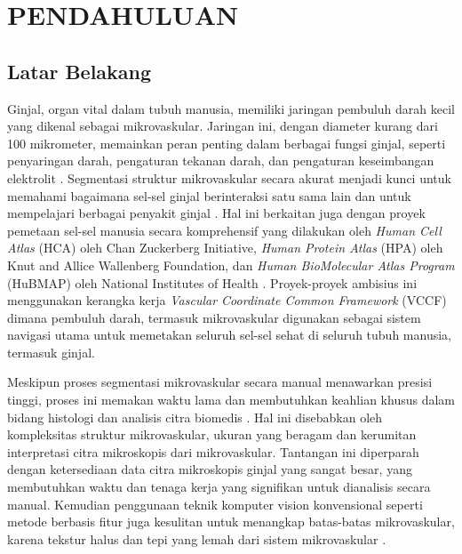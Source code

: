 \chapter{PENDAHULUAN}
\section{Latar Belakang}
\label{section:latarbelakang}
\noindent Ginjal, organ vital dalam tubuh manusia, memiliki jaringan pembuluh darah kecil yang dikenal sebagai mikrovaskular. Jaringan ini, dengan diameter kurang dari 100 mikrometer, memainkan peran penting dalam berbagai fungsi ginjal, seperti penyaringan darah, pengaturan tekanan darah, dan pengaturan keseimbangan elektrolit \cite{hu_multi-scale_2023}. Segmentasi struktur mikrovaskular secara akurat menjadi kunci untuk memahami bagaimana sel-sel ginjal berinteraksi satu sama lain dan untuk mempelajari berbagai penyakit ginjal \cite{zhao_attention-based_2023}. Hal ini berkaitan juga dengan proyek pemetaan sel-sel manusia secara komprehensif yang dilakukan oleh \textit{Human Cell Atlas} (HCA) oleh Chan Zuckerberg Initiative, \textit{Human Protein Atlas} (HPA) oleh Knut and Allice Wallenberg Foundation, dan \textit{Human BioMolecular Atlas Program} (HuBMAP) oleh National Institutes of Health \cite{weber_considerations_2020}. Proyek-proyek ambisius ini menggunakan kerangka kerja \textit{Vascular Coordinate Common Framework} (VCCF) dimana pembuluh darah, termasuk mikrovaskular digunakan sebagai sistem navigasi utama untuk memetakan seluruh sel-sel sehat di seluruh tubuh manusia, termasuk ginjal. 

\noindent Meskipun proses segmentasi mikrovaskular secara manual menawarkan presisi tinggi, proses ini memakan waktu lama dan membutuhkan keahlian khusus dalam bidang histologi dan analisis citra biomedis \cite{hu_multi-scale_2023,weber_considerations_2020}. Hal ini disebabkan oleh kompleksitas struktur mikrovaskular, ukuran yang beragam dan kerumitan interpretasi citra mikroskopis dari mikrovaskular. Tantangan ini diperparah dengan ketersediaan data citra mikroskopis ginjal yang sangat besar, yang membutuhkan waktu dan tenaga kerja yang signifikan untuk dianalisis secara manual. Kemudian penggunaan teknik komputer vision konvensional seperti metode berbasis fitur juga kesulitan untuk menangkap batas-batas mikrovaskular, karena tekstur halus dan tepi yang lemah dari sistem mikrovaskular \cite{zhao_attention-based_2023}.



